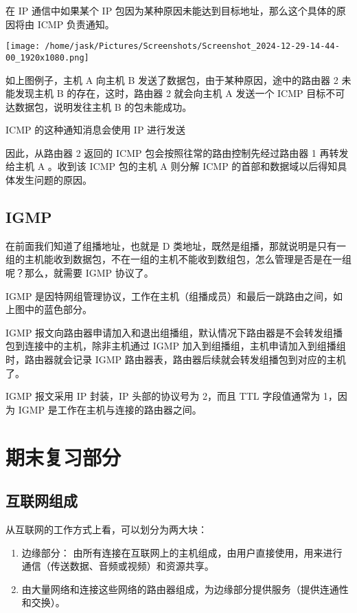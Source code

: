\documentclass[11pt]{article}
\begin{document}
在 IP 通信中如果某个 IP 包因为某种原因未能达到目标地址，那么这个具体的原因将由 ICMP 负责通知。

\begin{center}
\texttt{[image: /home/jask/Pictures/Screenshots/Screenshot\_2024-12-29-14-44-00\_1920x1080.png]}
\end{center}

如上图例子，主机 A 向主机 B 发送了数据包，由于某种原因，途中的路由器 2 未能发现主机 B 的存在，这时，路由器 2 就会向主机 A 发送一个 ICMP 目标不可达数据包，说明发往主机 B 的包未能成功。

ICMP 的这种通知消息会使用 IP 进行发送

因此，从路由器 2 返回的 ICMP 包会按照往常的路由控制先经过路由器 1 再转发给主机 A 。收到该 ICMP 包的主机 A 则分解 ICMP 的首部和数据域以后得知具体发生问题的原因。
\subsection{IGMP}
\label{sec:orgcb09733}
在前面我们知道了组播地址，也就是 D 类地址，既然是组播，那就说明是只有一组的主机能收到数据包，不在一组的主机不能收到数组包，怎么管理是否是在一组呢？那么，就需要 IGMP 协议了。

IGMP 是因特网组管理协议，工作在主机（组播成员）和最后一跳路由之间，如上图中的蓝色部分。

IGMP 报文向路由器申请加入和退出组播组，默认情况下路由器是不会转发组播包到连接中的主机，除非主机通过 IGMP 加入到组播组，主机申请加入到组播组时，路由器就会记录 IGMP 路由器表，路由器后续就会转发组播包到对应的主机了。

IGMP 报文采用 IP 封装，IP 头部的协议号为 2，而且 TTL 字段值通常为 1，因为 IGMP 是工作在主机与连接的路由器之间。
\section{期末复习部分}
\label{sec:org0cec4cc}
\subsection{互联网组成}
\label{sec:org16b2898}

从互联网的工作方式上看，可以划分为两大块：
\begin{enumerate}
\item 边缘部分： 由所有连接在互联网上的主机组成，由用户直接使用，用来进行通信（传送数据、音频或视频）和资源共享。
\item 由大量网络和连接这些网络的路由器组成，为边缘部分提供服务（提供连通性和交换）。
\end{enumerate}
\end{document}
